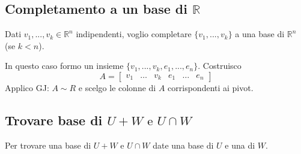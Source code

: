\subsection{Completamento a un base di $\mathbb{R}$}
Dati $v_1,...,v_k\in\mathbb{R}^n$ indipendenti, voglio completare $\{v_1,...,v_k\}$ a una base di $\mathbb{R}^n$ (se $k<n$).

In questo caso formo un insieme $\{v_1,...,v_k,e_1,...,e_n\}$. Costruisco 
\[A=\begin{bmatrix}v_1 & \dots & v_k & e_1 & \dots & e_n\end{bmatrix}\]
Applico GJ: $A\sim R$ e scelgo le colonne di $A$ corrispondenti ai pivot.

\subsection{Trovare base di $U+W\text{ e } U\cap W$}
Per trovare una base di $U+W\text{ e } U\cap W$ date una base di $U$ e una di $W$.
